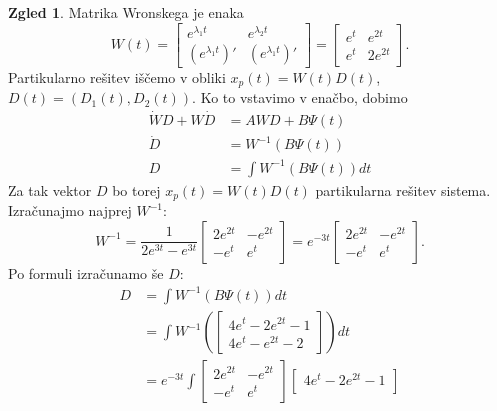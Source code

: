 \documentclass[12pt,a4paper]{amsart}
\theoremstyle{definition} %
\newtheorem{zgled}[definicija]{Zgled}
\theoremstyle{plain} %
\begin{document}
\begin{zgled}
    Matrika Wronskega je enaka
    \[W(t)=\begin{bmatrix}
        e^{\lambda_1t} & e^{\lambda_2t} \\
        (e^{\lambda_1t})' & (e^{\lambda_1t})' 
    \end{bmatrix}
    =\begin{bmatrix}
        e^t & e^{2t} \\
        e^t & 2e^{2t} 
    \end{bmatrix}.\]
    Partikularno rešitev iščemo v obliki $x_p(t)=W(t)D(t)$, $D(t)=(D_1(t),D_2(t)).$ Ko to vstavimo v enačbo, dobimo 
    \begin{equation*}
        \begin{split}
            \dot{W}D+W\dot{D} &= AWD+B\Psi(t) \\
            \dot{D}&=W^{-1}(B\Psi(t)) \\
            D &=\int W^{-1}(B\Psi(t))dt
        \end{split}
    \end{equation*}
    \overfullrule=0mm Za tak vektor $D$ bo torej $x_p(t)=W(t)D(t)$ partikularna rešitev sistema.
    Izračunajmo najprej $W^{-1}$:
    \[W^{-1}=\frac{1}{2e^{3t}-e^{3t}}\begin{bmatrix}
        2e^{2t} & -e^{2t} \\
        -e^t & e^t
    \end{bmatrix}=e^{-3t}\begin{bmatrix}
        2e^{2t} & -e^{2t} \\
        -e^t & e^t
    \end{bmatrix}.\] 
    Po formuli izračunamo še $D$:
    \begin{equation*}
        \begin{split}
            D &=\int W^{-1}(B\Psi(t))dt \\
                    &= \int W^{-1}(\begin{bmatrix}
                        4e^{t}-2e^{2t}-1  \\
                        4e^{t}-e^{2t}-2  
                    \end{bmatrix})dt \\
                    &= e^{-3t} \int \begin{bmatrix}
                        2e^{2t} & -e^{2t} \\
                        -e^t & e^t
                    \end{bmatrix} \begin{bmatrix}
                        4e^{t}-2e^{2t}-1  \\

\end{bmatrix}
\end{split}
\end{equation*}
\end{zgled}
\end{document}
